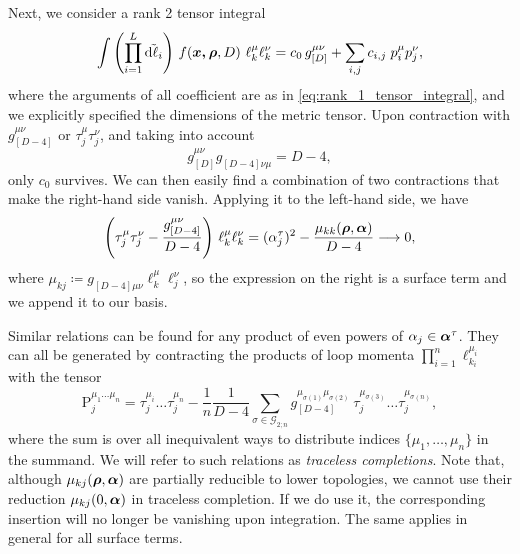 Next, we consider a rank 2 tensor integral
\begin{equation}
  \int \qty(\prod_{i=1}^{L} \tilde{\dd{\ell_i}}){}~ f(\vb*{\vb*{x},\vb*{\rho}},D) ~ \ell_k^{\mu}\ell_k^{\nu} = c_0\,g^{\mu\nu}_{[D]} + \sum_{i,j}^{}c_{i,j}\;p^\mu_i p^\nu_j,
\end{equation}
where the arguments of all coefficient are as in \cref{eq:rank_1_tensor_integral}, and we explicitly specified the dimensions of the metric tensor.
Upon contraction with $g^{\mu\nu}_{[D-4]}$ or $\tau_j^\mu\tau_j^\nu$, and taking into account
\[
  g^{\mu\nu}_{[D]}g^{\phantom{\mu\nu}}_{[D-4]\nu\mu} = D-4,
\]
only $c_0$ survives.
We can then easily find a combination of two contractions that make the right-hand side vanish. Applying it to the left-hand side, we have
\begin{equation}
  \qty(\tau_j^\mu\tau_j^\nu - \frac{g^{\mu\nu}_{[D-4]}}{D-4}) ~ \ell_k^{\mu}\ell_k^{\nu} = (\alpha_j^\tau)^2 - \frac{\mu_{kk}(\vb*{\rho},\vb*{\alpha})}{D-4} \longrightarrow 0,
\end{equation}
where $\mu_{kj} \coloneqq g^{\phantom{\mu\nu}}_{[D-4]\mu\nu} \ell_k^\mu \ell_j^\nu$, so the expression on the right is a surface term and
we append it to our basis.

Similar relations can be found for any product of even powers of $\alpha_j \in \vb*{\alpha}^\tau$.
They can all be generated by contracting the products of loop momenta $\prod_{i=1}^{n}\ell^{\mu_i}_{k_i}$ with the tensor
\begin{equation}
  \mathrm{P}^{\mu_1\ldots{}\mu_n}_j =  \tau^{\mu_i}_j\ldots{}\tau^{\mu_n}_j - \frac{1}{n}\frac{1}{D-4} \sum_{\sigma \in \mathcal{G}_{2;n}}^{} g^{\mu_{\sigma(1)}\mu_{\sigma(2)}}_{[D-4]}~\tau^{\mu_{\sigma(3)}}_j\ldots{}\tau^{\mu_{\sigma(n)}}_j,
\end{equation}
where the sum is over all inequivalent ways to distribute indices $\{\mu_1,\ldots{},\mu_n\}$ in the summand.
We will refer to such relations as \emph{traceless completions}.
Note that, although $\mu_{kj}(\vb*{\rho},\vb*{\alpha})$ are partially reducible to lower topologies,
we cannot use their reduction $\mu_{kj}(0,\vb*{\alpha})$ in traceless completion. If we do use it, the
corresponding insertion will no longer be vanishing upon integration.
The same applies in general for all surface terms.

